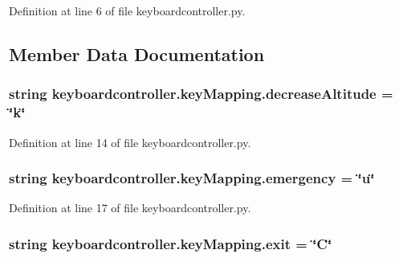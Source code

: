 Definition at line 6 of file keyboardcontroller.\-py.



\subsection{Member Data Documentation}
\hypertarget{classkeyboardcontroller_1_1keyMapping_ac55858cf442801f88d3919ba6162d82d}{
\subsubsection[{decrease\-Altitude}]{\setlength{\rightskip}{0pt plus 5cm}string keyboardcontroller.\-key\-Mapping.\-decrease\-Altitude = \char`\"{}k\char`\"{}\hspace{0.3cm}{\ttfamily [static]}}}\label{classkeyboardcontroller_1_1keyMapping_ac55858cf442801f88d3919ba6162d82d}


Definition at line 14 of file keyboardcontroller.\-py.

\hypertarget{classkeyboardcontroller_1_1keyMapping_af509f5078d3f610944639779a75710aa}{
\subsubsection[{emergency}]{\setlength{\rightskip}{0pt plus 5cm}string keyboardcontroller.\-key\-Mapping.\-emergency = \char`\"{}u\char`\"{}\hspace{0.3cm}{\ttfamily [static]}}}\label{classkeyboardcontroller_1_1keyMapping_af509f5078d3f610944639779a75710aa}


Definition at line 17 of file keyboardcontroller.\-py.

\hypertarget{classkeyboardcontroller_1_1keyMapping_a7c54d8a727c232de27f46de6f3dd5b8a}{
\subsubsection[{exit}]{\setlength{\rightskip}{0pt plus 5cm}string keyboardcontroller.\-key\-Mapping.\-exit = \char`\"{}C\char`\"{}\hspace{0.3cm}{\ttfamily [static]}}}\label{classkeyboardcontroller_1_1keyMapping_a7c54d8a727c232de27f46de6f3dd5b8a}


